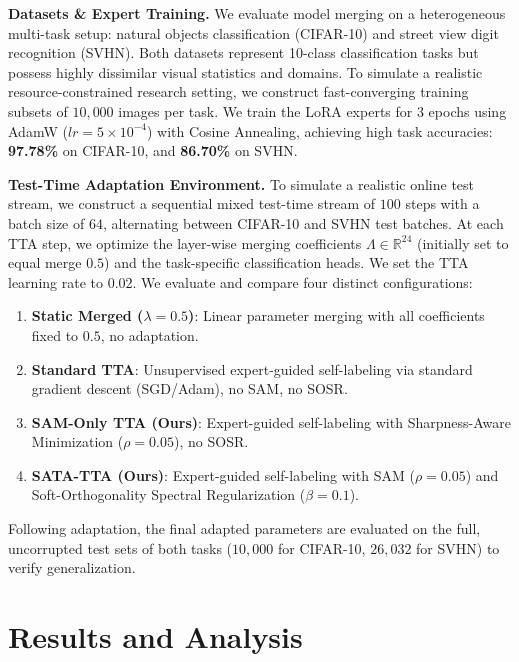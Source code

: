 \documentclass{article}
\theoremstyle{plain}
\theoremstyle{definition}
\theoremstyle{remark}
\begin{document}
\textbf{Datasets \& Expert Training.} We evaluate model merging on a heterogeneous multi-task setup: natural objects classification (CIFAR-10) and street view digit recognition (SVHN). Both datasets represent 10-class classification tasks but possess highly dissimilar visual statistics and domains. To simulate a realistic resource-constrained research setting, we construct fast-converging training subsets of $10,000$ images per task. We train the LoRA experts for $3$ epochs using AdamW ($lr=5 \times 10^{-4}$) with Cosine Annealing, achieving high task accuracies: \textbf{97.78\%} on CIFAR-10, and \textbf{86.70\%} on SVHN.

\textbf{Test-Time Adaptation Environment.} To simulate a realistic online test stream, we construct a sequential mixed test-time stream of $100$ steps with a batch size of $64$, alternating between CIFAR-10 and SVHN test batches. At each TTA step, we optimize the layer-wise merging coefficients $\Lambda \in \mathbb{R}^{24}$ (initially set to equal merge $0.5$) and the task-specific classification heads. We set the TTA learning rate to $0.02$. We evaluate and compare four distinct configurations:
\begin{enumerate}
  \item \textbf{Static Merged ($\lambda=0.5$)}: Linear parameter merging with all coefficients fixed to $0.5$, no adaptation.
  \item \textbf{Standard TTA}: Unsupervised expert-guided self-labeling via standard gradient descent (SGD/Adam), no SAM, no SOSR.
  \item \textbf{SAM-Only TTA (Ours)}: Expert-guided self-labeling with Sharpness-Aware Minimization ($\rho=0.05$), no SOSR.
  \item \textbf{SATA-TTA (Ours)}: Expert-guided self-labeling with SAM ($\rho=0.05$) and Soft-Orthogonality Spectral Regularization ($\beta=0.1$).
\end{enumerate}
Following adaptation, the final adapted parameters are evaluated on the full, uncorrupted test sets of both tasks ($10,000$ for CIFAR-10, $26,032$ for SVHN) to verify generalization.

\section{Results and Analysis}
\label{submission-results}
\end{document}
